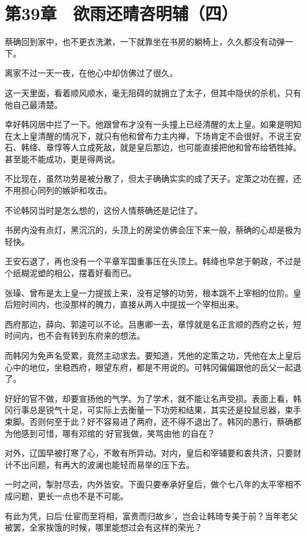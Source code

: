 \section{第39章　欲雨还晴咨明辅（四）}

 蔡确回到家中，也不更衣洗漱，一下就靠坐在书房的躺椅上，久久都没有动弹一下。

离家不过一天一夜，在他心中却仿佛过了很久。

这一天里面，看着顺风顺水，毫无阻碍的就拥立了太子，但其中隐伏的杀机，只有他自己最清楚。

幸好韩冈居中拦了一下。他跟曾布才没有一头撞上已经清醒的太上皇。如果是明知在太上皇清醒的情况下，就只有他和曾布力主内禅，下场肯定不会很好。不说王安石、韩绛、章惇等人立成死敌，就是皇后那边，也可能直接把他和曾布给牺牲掉。甚至能不能成功，更是得两说。

不比现在，虽然功劳是被分散了，但太子确确实实的成了天子。定策之功在握，还不用担心同列的嫉妒和攻击。

不论韩冈当时是怎么想的，这份人情蔡确还是记住了。

书房内没有点灯，黑沉沉的，头顶上的房梁仿佛会压下来一般，蔡确的心却是极为轻快。

王安石退了，再也没有一个平章军国重事压在头顶上。韩绛也早怠于朝政，不过是个纸糊泥塑的相公，摆着好看而已。

张璪、曾布是太上皇一力提拔上来，没有足够的功劳，根本跳不上宰相的位阶。皇后短时间内，也没那样的魄力，直接从两人中提拔一个宰相出来。

西府那边，薛向、郭逵可以不论。吕惠卿一去，章惇就是名正言顺的西府之长，短时间内，也不会有转到东府来的想法。

而韩冈为免声名受累，竟然主动求去。要知道，凭他的定策之功，凭他在太上皇后心中的地位，坐稳西府，眼望东府，都是不用说的。可韩冈偏偏跟他的岳父一起退了。

好好的官不做，却要宣扬他的气学。为了学术，就不能让名声受损。表面上看，韩冈行事总是锐气十足，可实际上去衡量一下功劳和结果，其实还是投鼠忌器，束手束脚。否则何至于此？好不容易进了两府，还不得不退出了。韩冈的愚行，蔡确都为他感到可惜，哪有邓绾的‘好官我做，笑骂由他’的自在？

对外，辽国早被打寒了心，不敢有所异动。对内，皇后和宰辅要和衷共济，只要财计不出问题，有再大的波澜也能轻而易举的压下去。

一时之间，掣肘尽去，内外皆安。下面只要奉承好皇后，做个七八年的太平宰相不成问题，更长一点也不是不可能。

有此为凭，曰后‘仕宦而至将相，富贵而归故乡’，岂会让韩琦专美于前？当年老父被罢，全家挨饿的时候，哪里能想过会有这样的荣光？

